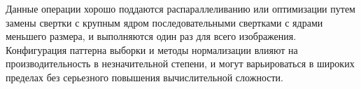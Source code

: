 {{{{{		Данные операции хорошо поддаются распараллеливанию или оптимизации путем замены свертки с крупным ядром последовательными свертками с ядрами меньшего размера, и выполняются один раз для всего изображения. Конфигурация паттерна выборки и методы нормализации влияют на производительность в незначительной степени, и могут варьироваться в широких пределах без серьезного повышения вычислительной сложности. 
	}
	\newpage
%   		
%   		
%   		
%   		
%   		
%   	
%   		
%   		
%   		
}}}}
